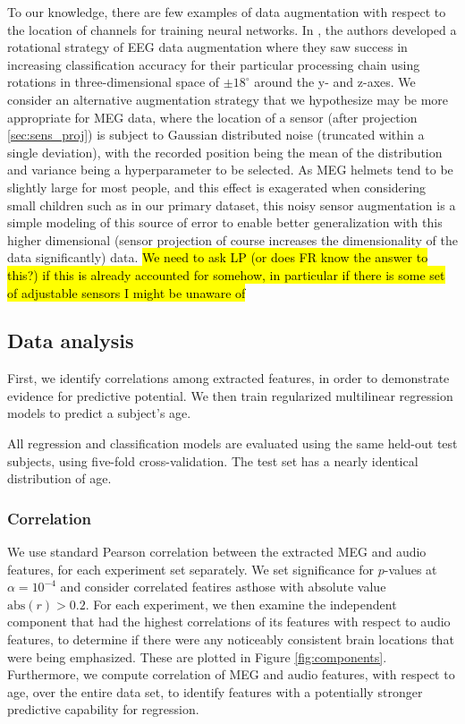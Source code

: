 \documentclass[utf8]{frontiersSCNS} %
\begin{document}
To our knowledge, there are few examples of data augmentation with respect to the location of channels for training neural networks. In \cite{Krell2017}, the authors developed a rotational strategy of EEG data augmentation where they saw success in increasing classification accuracy for their particular processing chain using rotations in three-dimensional space of $\pm 18^{\circ}$ around the y- and z-axes. We consider an alternative augmentation strategy that we hypothesize may be more appropriate for MEG data, where the location of a sensor (after projection \ref{sec:sens_proj}) is subject to Gaussian distributed noise (truncated within a single deviation), with the recorded position being the mean of the distribution and variance being a hyperparameter to be selected. As MEG helmets tend to be slightly large for most people, and this effect is exagerated when considering small children such as in our primary dataset, this noisy sensor augmentation is a simple modeling of this source of error to enable better generalization with this higher dimensional (sensor projection of course increases the dimensionality of the data significantly) data. \hl{We need to ask LP (or does FR know the answer to this?) if this is already accounted for somehow, in particular if there is some set of adjustable sensors I might be unaware of}

\subsection{Data analysis}

First, we identify correlations among extracted features, in order to demonstrate evidence for predictive potential. We then train regularized multilinear regression models to predict a subject's age.

All regression and classification models are evaluated using the same held-out test subjects, using five-fold cross-validation. The test set has a nearly identical distribution of age.

\subsubsection{Correlation}

We use standard Pearson correlation between the extracted MEG and audio features, for each experiment set separately. We set significance for $p$-values at $\alpha = 10^{-4}$ and consider correlated featires asthose with absolute value $\text{abs}(r) > 0.2$. For each experiment, we then examine the independent component that had the highest correlations of its features with respect to audio features, to determine if there were any noticeably consistent brain locations that were being emphasized. These are plotted in Figure \ref{fig:components}. Furthermore, we compute correlation of MEG and audio features, with respect to age, over the entire data set, to identify features with a potentially stronger predictive capability for regression.
\end{document}
